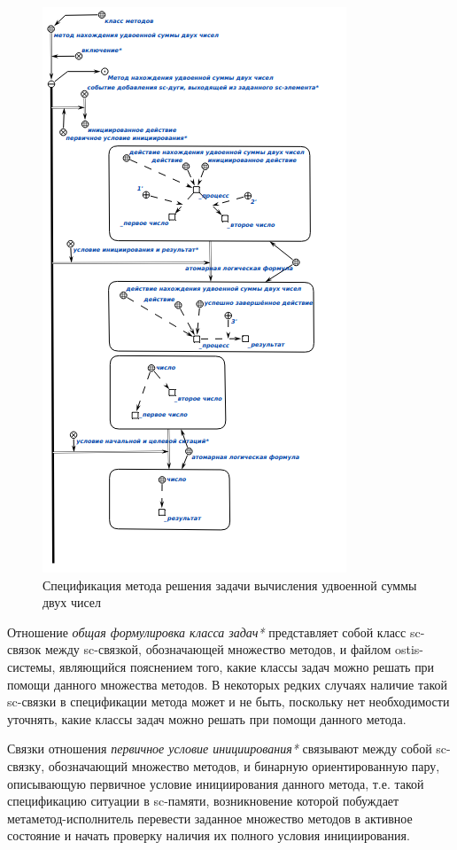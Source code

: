 \begin{figure}[htbp]
  \center
  \includegraphics[scale=0.6]{author/part3/figures/condition_and_result.png}
  \caption{Спецификация метода решения задачи вычисления удвоенной суммы двух чисел}
  \label{fig:condition_and_result}
\end{figure}

Отношение \textit{общая формулировка класса задач*} представляет собой класс sc-связок между sc-связкой, обозначающей множество методов, и файлом ostis-системы, являющийся пояснением того, какие классы задач можно решать при помощи данного множества методов. В некоторых редких случаях наличие такой sc-связки в спецификации метода может и не быть, поскольку нет необходимости уточнять, какие классы задач можно решать при помощи данного метода.

Связки отношения \textit{первичное условие инициирования*} связывают между собой sc-связку, обозначающий множество методов, и бинарную ориентированную пару, описывающую первичное условие инициирования данного метода, т.е. такой спецификацию ситуации в sc-памяти, возникновение которой побуждает метаметод-исполнитель перевести заданное множество методов в активное состояние и начать проверку наличия их полного условия инициирования.

